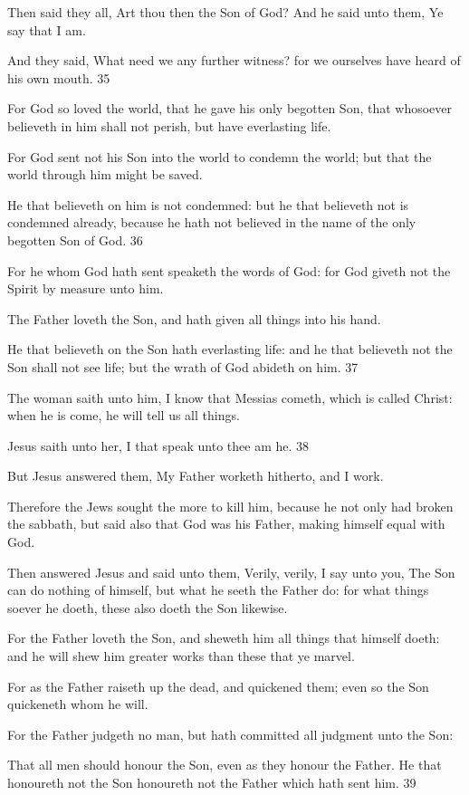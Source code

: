 Then said they all, Art thou then the Son of God? And he said unto them, Ye say that I am.

And they said, What need we any further witness? for we ourselves have heard of his own
mouth. 35

For God so loved the world, that he gave his only begotten Son, that whosoever believeth in
him shall not perish, but have everlasting life.

For God sent not his Son into the world to condemn the world; but that the world through
him might be saved.

He that believeth on him is not condemned: but he that believeth not is condemned already,
because he hath not believed in the name of the only begotten Son of God. 36

For he whom God hath sent speaketh the words of God: for God giveth not the Spirit by
measure unto him.

The Father loveth the Son, and hath given all things into his hand.

He that believeth on the Son hath everlasting life: and he that believeth not the Son shall not
see life; but the wrath of God abideth on him. 37

The woman saith unto him, I know that Messias cometh, which is called Christ: when he is
come, he will tell us all things.

Jesus saith unto her, I that speak unto thee am he. 38

But Jesus answered them, My Father worketh hitherto, and I work.

Therefore the Jews sought the more to kill him, because he not only had broken the sabbath,
but said also that God was his Father, making himself equal with God.

Then answered Jesus and said unto them, Verily, verily, I say unto you, The Son can do
nothing of himself, but what he seeth the Father do: for what things soever he doeth, these
also doeth the Son likewise.

For the Father loveth the Son, and sheweth him all things that himself doeth: and he will
shew him greater works than these that ye marvel.

For as the Father raiseth up the dead, and quickened them; even so the Son quickeneth whom
he will.

For the Father judgeth no man, but hath committed all judgment unto the Son:

That all men should honour the Son, even as they honour the Father. He that honoureth not
the Son honoureth not the Father which hath sent him. 39

